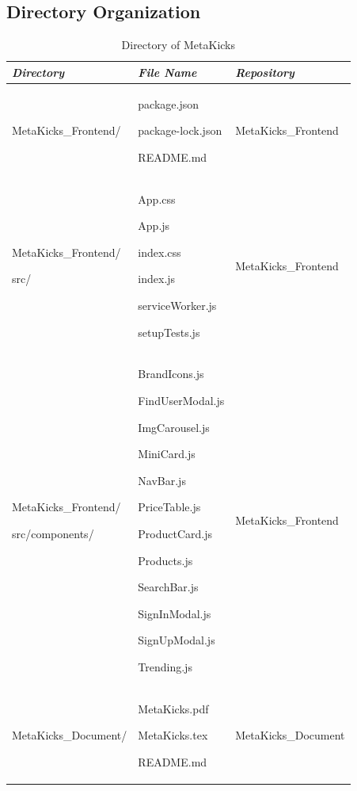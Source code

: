 \documentclass[conference]{IEEEtran}
\begin{document}
\subsection{Directory Organization}
\begin{table}[h]
\caption{Directory of MetaKicks}
\def\arraystretch{1.24} \small
    \begin{tabular}{|p{2.8cm}|p{2.4cm}|p{2.7cm}|}
        \hline
        \textbf{\textit{Directory}} & \textbf{\textit{File Name}} & \textbf{\textit{Repository}} \\ \hline
        MetaKicks\_Frontend/ & package.json \par package-lock.json \par README.md & MetaKicks\_Frontend\\ \hline
         
        MetaKicks\_Frontend/\par src/ \par & App.css \par App.js \par index.css \par index.js \par serviceWorker.js \par 					setupTests.js \par  & MetaKicks\_Frontend\\ \hline
	
	MetaKicks\_Frontend/\par src/components/ & BrandIcons.js \par FindUserModal.js \par ImgCarousel.js \par MiniCard.js \par NavBar.js \par PriceTable.js \par ProductCard.js \par Products.js \par SearchBar.js \par SignInModal.js \par SignUpModal.js \par Trending.js & MetaKicks\_Frontend\\ \hline
MetaKicks\_Document/ & MetaKicks.pdf \par MetaKicks.tex \par README.md & MetaKicks\_Document\\ \hline
\end{tabular}


\end{table}
\end{document}

